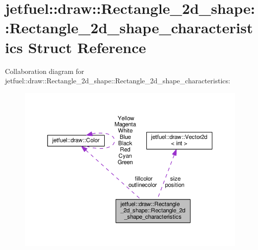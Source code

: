 \hypertarget{structjetfuel_1_1draw_1_1Rectangle__2d__shape_1_1Rectangle__2d__shape__characteristics}{}\section{jetfuel\+:\+:draw\+:\+:Rectangle\+\_\+2d\+\_\+shape\+:\+:Rectangle\+\_\+2d\+\_\+shape\+\_\+characteristics Struct Reference}
\label{structjetfuel_1_1draw_1_1Rectangle__2d__shape_1_1Rectangle__2d__shape__characteristics}


Collaboration diagram for jetfuel\+:\+:draw\+:\+:Rectangle\+\_\+2d\+\_\+shape\+:\+:Rectangle\+\_\+2d\+\_\+shape\+\_\+characteristics\+:\nopagebreak
\begin{figure}[H]
\begin{center}
\leavevmode
\includegraphics[width=350pt]{structjetfuel_1_1draw_1_1Rectangle__2d__shape_1_1Rectangle__2d__shape__characteristics__coll__graph}
\end{center}
\end{figure}
